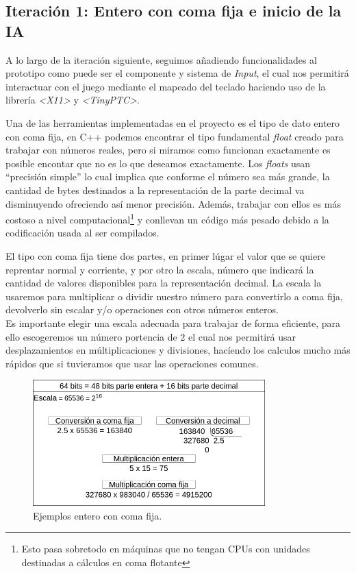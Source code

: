 \subsection*{Iteración 1: Entero con coma fija e inicio de la IA}
A lo largo de la iteración siguiente, seguimos añadiendo funcionalidades al prototipo como puede 
ser el componente y sistema de \textit{Input}, el cual nos permitirá interactuar con el juego
mediante el mapeado del teclado haciendo uso de la librería \textit{\textless X11\textgreater}
y \textit{\textless TinyPTC\textgreater}.

Una de las herramientas implementadas en el proyecto es el tipo de dato entero con coma fija,
en C++ podemos encontrar el tipo fundamental \textit{float} creado para trabajar con números 
reales, pero si miramos como funcionan exactamente es posible encontar que no es lo que deseamos
exactamente. Los \textit{floats} usan ``precisión simple'' lo cual implica que conforme el número 
sea más grande, la cantidad de bytes destinados a la representación de la parte decimal va 
disminuyendo ofreciendo así menor precisión. Además, trabajar con ellos es más costoso a nivel
computacional\footnote{Esto pasa sobretodo en máquinas que no tengan CPUs con unidades destinadas 
a cálculos en coma flotante} y conllevan un código más pesado debido a la codificación usada 
al ser compilados.

El tipo con coma fija tiene dos partes, en primer lúgar el valor que se quiere reprentar normal
y corriente, y por otro la escala, número que indicará la cantidad de valores disponibles
para la representación decimal. La escala la usaremos para multiplicar o dividir nuestro número
para convertirlo a coma fija, devolverlo sin escalar y/o operaciones con otros números enteros.\\
Es importante elegir una escala adecuada para trabajar de forma eficiente, para ello escogeremos
un número portencia de 2 el cual nos permitirá usar desplazamientos en múltiplicaciones y divisiones,
hacíendo los calculos mucho más rápidos que si tuvieramos que usar las operaciones comunes.

\begin{figure}[htb]
\centering
\includegraphics[width=0.8\textwidth]{imagenes/diario_desarrollo/Entero_fijo.png}
\caption{Ejemplos entero con coma fija.}
\label{fig:fixed}
\end{figure} 

